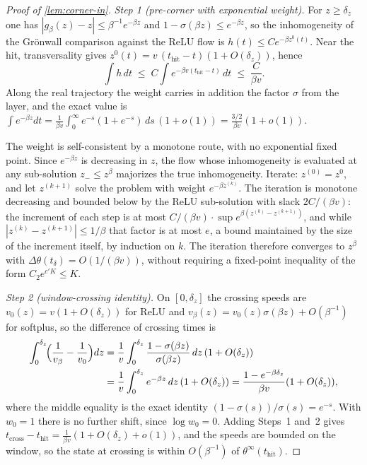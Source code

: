 \documentclass[11pt]{article}
\theoremstyle{definition}
\theoremstyle{remark}
\newcommand{\thit}{t_{\mathrm{hit}}}
\begin{document}
\begin{proof}[Proof of \cref{lem:corner-in}]
\emph{Step 1 (pre-corner with exponential weight).} For $z\ge\delta_z$ one has
$|g_\beta(z)-z|\le\beta^{-1}e^{-\beta z}$ and $1-\sigma(\beta z)\le e^{-\beta z}$,
so the inhomogeneity of the Gr\"onwall comparison against the ReLU flow is
$h(t)\le Ce^{-\beta z^0(t)}$. Near the hit, transversality gives
$z^0(t)=v\,(\thit-t)(1+O(\delta_z))$, hence
\[
\int h\,dt\;\le\;C\!\int e^{-\beta v(\thit-t)}\,dt\;\le\;\frac{C}{\beta v}.
\]
Along the real trajectory the weight carries in addition the factor $\sigma$ from
the layer, and the exact value is
$\int e^{-\beta z}dt=\tfrac{1}{\beta v}\int_0^\infty e^{-s}(1+e^{-s})\,ds\,(1+o(1))
=\tfrac{3/2}{\beta v}(1+o(1))$.

The weight is self-consistent by a monotone route, with no exponential fixed
point. Since $e^{-\beta z}$ is decreasing in $z$, the flow whose inhomogeneity is
evaluated at any sub-solution $z_-\le z^\beta$ majorizes the true inhomogeneity.
Iterate: $z^{(0)}=z^{0}$, and let $z^{(k+1)}$ solve the problem with weight
$e^{-\beta z^{(k)}}$. The iteration is monotone decreasing and bounded below by
the ReLU sub-solution with slack $2C/(\beta v)$: the increment of each step is at
most $C/(\beta v)\cdot\sup e^{\beta(z^{(k)}-z^{(k+1)})}$, and while
$|z^{(k)}-z^{(k+1)}|\le1/\beta$ that factor is at most $e$, a bound maintained by
the size of the increment itself, by induction on $k$. The iteration therefore
converges to $z^\beta$ with $\Delta\theta(t_\delta)=O(1/(\beta v))$, without
requiring a fixed-point inequality of the form $C_2e^{c'K}\le K$.

\emph{Step 2 (window-crossing identity).} On $[0,\delta_z]$ the crossing speeds
are $v_0(z)=v(1+O(\delta_z))$ for ReLU and
$v_\beta(z)=v_0(z)\sigma(\beta z)+O(\beta^{-1})$ for softplus, so the difference
of crossing times is
\begin{align*}
\int_0^{\delta_z}\!\Bigl(\frac{1}{v_\beta}-\frac{1}{v_0}\Bigr)dz
&=\frac{1}{v}\int_0^{\delta_z}\frac{1-\sigma(\beta z)}{\sigma(\beta z)}\,dz\,(1+O(\delta_z))\\
&=\frac{1}{v}\int_0^{\delta_z}e^{-\beta z}\,dz\,(1+O(\delta_z))
=\frac{1-e^{-\beta\delta_z}}{\beta v}(1+O(\delta_z)),
\end{align*}
where the middle equality is the exact identity
$(1-\sigma(s))/\sigma(s)=e^{-s}$. With $w_0=1$ there is no further shift, since
$\log w_0=0$. Adding Steps~1 and~2 gives
$t_{\mathrm{cross}}-\thit=\tfrac{1}{\beta v}(1+O(\delta_z)+o(1))$, and the speeds
are bounded on the window, so the state at crossing is within $O(\beta^{-1})$ of
$\theta^\infty(\thit)$.
\end{proof}
\end{document}
